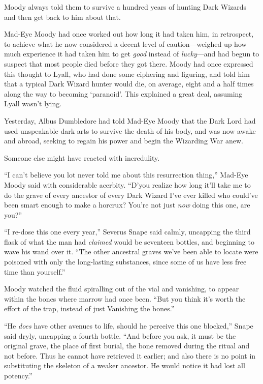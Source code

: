 Moody always told them to survive a hundred years of hunting Dark Wizards and then get back to him about that.

Mad-Eye Moody had once worked out how long it had taken him, in retrospect, to achieve what he now considered a decent level of caution—weighed up how much experience it had taken him to get \emph{good} instead of \emph{lucky}—and had begun to suspect that most people died before they got there. Moody had once expressed this thought to Lyall, who had done some ciphering and figuring, and told him that a typical Dark Wizard hunter would die, on average, eight and a half times along the way to becoming ‘paranoid’. This explained a great deal, assuming Lyall wasn’t lying.

Yesterday, Albus Dumbledore had told Mad-Eye Moody that the Dark Lord had used unspeakable dark arts to survive the death of his body, and was now awake and abroad, seeking to regain his power and begin the Wizarding War anew.

Someone else might have reacted with incredulity.

“I can’t believe you lot never told me about this resurrection thing,” Mad-Eye Moody said with considerable acerbity. “D’you realize how long it’ll take me to do the grave of every ancestor of every Dark Wizard I’ve ever killed who could’ve been smart enough to make a horcrux? You’re not just \emph{now} doing this one, are you?”

“I re-dose this one every year,” Severus Snape said calmly, uncapping the third flask of what the man had \emph{claimed} would be seventeen bottles, and beginning to wave his wand over it. “The other ancestral graves we’ve been able to locate were poisoned with only the long-lasting substances, since some of us have less free time than yourself.”

Moody watched the fluid spiralling out of the vial and vanishing, to appear within the bones where marrow had once been. “But you think it’s worth the effort of the trap, instead of just Vanishing the bones.”

“He \emph{does} have other avenues to life, should he perceive this one blocked,” Snape said dryly, uncapping a fourth bottle. “And before you ask, it must be the original grave, the place of first burial, the bone removed during the ritual and not before. Thus he cannot have retrieved it earlier; and also there is no point in substituting the skeleton of a weaker ancestor. He would notice it had lost all potency.”

